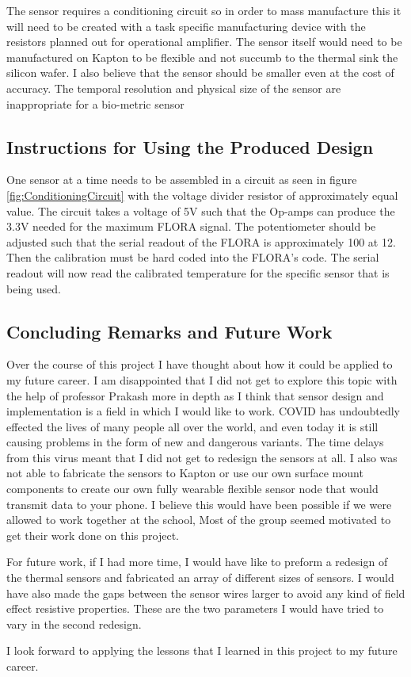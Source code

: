 \documentclass[12pt,a4paper]{report}
\begin{document}
The sensor requires a conditioning circuit so in order to mass manufacture this it will need to be created with a task specific manufacturing device with the resistors planned out for operational amplifier. The sensor itself would need to be manufactured on Kapton to be flexible and not succumb to the thermal sink the silicon wafer. I also believe that the sensor should be smaller even at the cost of accuracy. The temporal resolution and physical size of the sensor are inappropriate for a bio-metric sensor

\subsection{Instructions for Using the Produced Design}

One sensor at a time needs to be assembled in a circuit as seen in figure \ref{fig:ConditioningCircuit} with the voltage divider resistor of approximately equal value. The circuit takes a voltage of 5V such that the Op-amps can produce the 3.3V needed for the maximum FLORA signal. The potentiometer should be adjusted such that the serial readout of the FLORA is approximately 100 at 12\textcelsius{}. Then the calibration must be hard coded into the FLORA's code. The serial readout will now read the calibrated temperature for the specific sensor that is being used. 

\subsection{Concluding Remarks and Future Work}

Over the course of this project I have thought about how it could be applied to my future career. I am disappointed that I did not get to explore this topic with the help of professor Prakash more in depth as I think that sensor design and implementation is a field in which I would like to work. COVID has undoubtedly effected the lives of many people all over the world, and even today it is still causing problems in the form of new and dangerous variants. The time delays from this virus meant that I did not get to redesign the sensors at all. I also was not able to fabricate the sensors to Kapton or use our own surface mount components to create our own fully wearable flexible sensor node that would transmit data to your phone. I believe this would have been possible if we were allowed to work together at the school, Most of the group seemed motivated to get their work done on this project.\par

For future work, if I had more time, I would have like to preform a redesign of the thermal sensors and fabricated an array of different sizes of sensors. I would have also made the gaps between the sensor wires larger to avoid any kind of field effect resistive properties. These are the two parameters I would have tried to vary in the second redesign.\par

I look forward to applying the lessons that I learned in this project to my future career.
\end{document}
